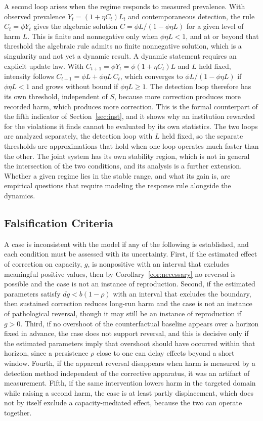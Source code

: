 \documentclass[12pt]{article}
\theoremstyle{remark}
\begin{document}
A second loop arises when the regime responds to measured prevalence. With observed prevalence $Y_t = (1 + \eta C_t)L_t$ and contemporaneous detection, the rule $C_t = \phi Y_t$ gives the algebraic solution $C = \phi L/(1 - \phi\eta L)$ for a given level of harm $L$. This is finite and nonnegative only when $\phi\eta L < 1$, and at or beyond that threshold the algebraic rule admits no finite nonnegative solution, which is a singularity and not yet a dynamic result. A dynamic statement requires an explicit update law. With $C_{t+1} = \phi Y_t = \phi(1 + \eta C_t)L$ and $L$ held fixed, intensity follows $C_{t+1} = \phi L + \phi\eta L\, C_t$, which converges to $\phi L/(1 - \phi\eta L)$ if $\phi\eta L < 1$ and grows without bound if $\phi\eta L \ge 1$. The detection loop therefore has its own threshold, independent of $S$, because more correction produces more recorded harm, which produces more correction. This is the formal counterpart of the fifth indicator of Section~\ref{sec:inst}, and it shows why an institution rewarded for the violations it finds cannot be evaluated by its own statistics. The two loops are analyzed separately, the detection loop with $L$ held fixed, so the separate thresholds are approximations that hold when one loop operates much faster than the other. The joint system has its own stability region, which is not in general the intersection of the two conditions, and its analysis is a further extension. Whether a given regime lies in the stable range, and what its gain is, are empirical questions that require modeling the response rule alongside the dynamics.

\subsection{Falsification Criteria}

A case is inconsistent with the model if any of the following is established, and each condition must be assessed with its uncertainty. First, if the estimated effect of correction on capacity, $g$, is nonpositive with an interval that excludes meaningful positive values, then by Corollary~\ref{cor:necessary} no reversal is possible and the case is not an instance of reproduction. Second, if the estimated parameters satisfy $dg < b(1-\rho)$ with an interval that excludes the boundary, then sustained correction reduces long-run harm and the case is not an instance of pathological reversal, though it may still be an instance of reproduction if $g > 0$. Third, if no overshoot of the counterfactual baseline appears over a horizon fixed in advance, the case does not support reversal, and this is decisive only if the estimated parameters imply that overshoot should have occurred within that horizon, since a persistence $\rho$ close to one can delay effects beyond a short window. Fourth, if the apparent reversal disappears when harm is measured by a detection method independent of the corrective apparatus, it was an artifact of measurement. Fifth, if the same intervention lowers harm in the targeted domain while raising a second harm, the case is at least partly displacement, which does not by itself exclude a capacity-mediated effect, because the two can operate together.
\end{document}
